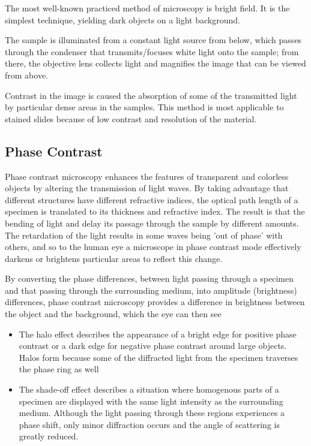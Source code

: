 \documentclass[12pt]{../SOP3_beta}
\begin{document}
\NP The most well-known practiced method of microscopy is bright field. It is the simplest technique, yielding dark objects on a light background. 

\NP The sample is illuminated from a constant light source from below, which passes through the condenser that transmits/focuses white light onto the sample; from there, the objective lens collects light and magnifies the image that can be viewed from above. 

\NP Contrast in the image is caused the absorption of some of the transmitted light by particular dense areas in the samples. This method is most applicable to stained slides because of low contrast and resolution of the material. 

\subsection*{Phase Contrast}

\NP Phase contrast microscopy enhances the features of transparent and colorless objects by altering the transmission of light waves. 
\NP By taking advantage that different structures have different refractive indices, the optical path length of a specimen is translated to its thickness and refractive index. The result is that the bending of light and delay its passage through the sample by different amounts. The retardation of the light results in some waves being 'out of phase' with others, and so to the human eye a microscope in phase contrast mode effectively darkens or brightens particular areas to reflect this change. 

\NP By converting the phase differences, between light passing through a specimen and that passing through the surrounding medium, into amplitude (brightness) differences, phase contrast microscopy provides a difference in brightness between the object and the background, which the eye can then see

  \begin{itemize}
  \item The halo effect describes the appearance of a bright edge for positive phase contrast or a dark edge for negative phase contrast around large objects. Halos form because some of the diffracted light from the specimen traverses the phase ring as well
  \item The shade-off effect describes a situation where homogenous parts of a specimen are displayed with the same light intensity as the surrounding medium. Although the light passing through these regions experiences a phase shift, only minor diffraction occurs and the angle of scattering is greatly reduced. 
\end{itemize}
\end{document}
